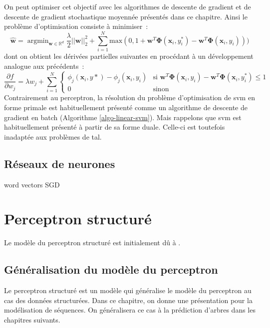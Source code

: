 \documentclass[11pt,openany]{book}
\newcommand{\ac}[1]{{\sc #1}} %
\begin{document}
On peut optimiser cet objectif avec les
algorithmes de descente de gradient et de descente de gradient
stochastique moyennée présentés dans ce chapitre. Ainsi le problème
d'optimisation consiste à minimiser~:
\begin{equation}
\hat{\mathbf{w}}=\mathop{\text{argmin}}_{\mathbf{w} \in \mathbb{R}^d}
\frac{\lambda}{2}||\mathbf{w}||_2^2+\sum_{i=1}^N
\text{max}(0,
1+\mathbf{w}^T\boldsymbol\Phi(\mathbf{x}_i,y^*_i) - \mathbf{w}^T\boldsymbol\Phi(\mathbf{x}_i,y_i) ))
\end{equation}
dont on obtient les dérivées partielles suivantes en procédant à un
développement analogue aux précédents~:
\begin{equation}
\frac{\partial f}{\partial w_j} = \lambda w_j+\sum_{i=1}^N
\left\{
\begin{array}{ll}
\phi_j(\mathbf{x}_i,y*) - \phi_j(\mathbf{x}_i,y_i) & \text{si }  
\mathbf{w}^T\boldsymbol\Phi(\mathbf{x}_i,y_i)   - \mathbf{w}^T\boldsymbol\Phi(\mathbf{x}_i,y^*_i) \leq 1\\
0&\text{sinon}
\end{array}\right.
\end{equation}
Contrairement au perceptron, la résolution du problème d'optimisation
de \ac{svm} en forme primale est
habituellement présenté comme un  algorithme de descente de gradient en batch
(Algorithme \ref{algo-linear-svm}). Mais rappelons que \ac{svm} est
habituellement présenté à partir de sa forme duale.  Celle-ci est
toutefois inadaptée
aux problèmes de \ac{tal}. 


\section{Réseaux de neurones}
    word vectors
    SGD


\chapter{Perceptron structuré}

Le modèle du perceptron structuré est initialement dû à \cite{collins-2002}.

\section{Généralisation du modèle du perceptron}

Le perceptron structuré est un modèle qui généralise le modèle du
perceptron au cas des données structurées. 
Dans ce chapitre, on donne une présentation pour la modélisation de
séquences. On généralisera ce cas à la prédiction d'arbres dans les
chapitres suivants.
\end{document}
